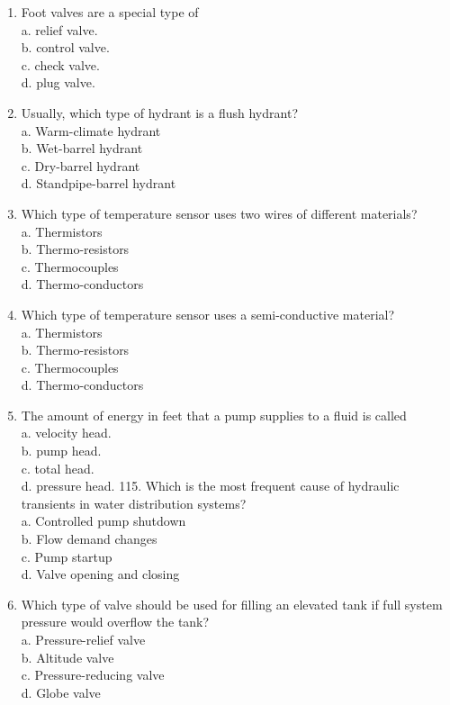 \documentclass[10pt]{article}
\begin{document}
\begin{enumerate}
  \item Foot valves are a special type of\\
a. relief valve.\\
b. control valve.\\
c. check valve.\\
d. plug valve.

  \item Usually, which type of hydrant is a flush hydrant?\\
a. Warm-climate hydrant\\
b. Wet-barrel hydrant\\
c. Dry-barrel hydrant\\
d. Standpipe-barrel hydrant

  \item Which type of temperature sensor uses two wires of different materials?\\
a. Thermistors\\
b. Thermo-resistors\\
c. Thermocouples\\
d. Thermo-conductors

  \item Which type of temperature sensor uses a semi-conductive material?\\
a. Thermistors\\
b. Thermo-resistors\\
c. Thermocouples\\
d. Thermo-conductors

  \item The amount of energy in feet that a pump supplies to a fluid is called\\
a. velocity head.\\
b. pump head.\\
c. total head.\\
d. pressure head. 115. Which is the most frequent cause of hydraulic transients in water distribution systems?\\
a. Controlled pump shutdown\\
b. Flow demand changes\\
c. Pump startup\\
d. Valve opening and closing

  \item Which type of valve should be used for filling an elevated tank if full system pressure would overflow the tank?\\
a. Pressure-relief valve\\
b. Altitude valve\\
c. Pressure-reducing valve\\
d. Globe valve


\end{enumerate}
\end{document}
